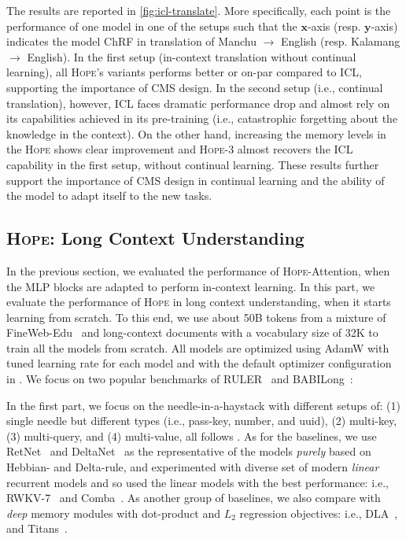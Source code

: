 \documentclass{article}
\newcommand{\citep}{\parencite}
\newcommand{\citet}{\textcite}
\newcommand{\head}[1]{\vspace{1.7mm}\noindent{{\textcolor{c4}{\bf #1.}}}}
\newcommand{\model}[0]{\textsc{Hope}}
\newcommand{\vx}{\boldsymbol{x}}
\newcommand{\vy}{\boldsymbol{y}}
\begin{document}
{The results are reported in \autoref{fig:icl-translate}. More specifically, each point is the performance of one model in one of the setups such that the $\vx$-axis (resp. $\vy$-axis) indicates the model ChRF in translation of Manchu $\rightarrow$ English (resp. Kalamang $\rightarrow$ English). In the first setup (in-context translation without continual learning), all \model's variants performs better or on-par compared to ICL, supporting the importance of CMS design. In the second setup (i.e., continual translation), however, ICL faces dramatic performance drop and almost rely on its capabilities achieved in its pre-training (i.e., catastrophic forgetting about the knowledge in the context). On the other hand, increasing the memory levels in the \model{} shows clear improvement and \model-3 almost recovers the ICL capability in the first setup, without continual learning. These results further support the importance of CMS design in continual learning and the ability of the model to adapt itself to the new tasks. 

\subsection{\model: Long Context Understanding}\label{sec:exp-niah}
In the previous section, we evaluated the performance of \model-Attention, when the MLP blocks are adapted to perform in-context learning. In this part, we evaluate the performance of \model{} in long context understanding, when it starts learning from scratch. To this end, we use about 50B tokens from a mixture of FineWeb-Edu~\citep{penedo2024fineweb} and long-context documents with a vocabulary size of 32K to train all the models from scratch. All models are optimized using AdamW with tuned learning rate for each model and with the default optimizer configuration in \citet{behrouz2024titans}. We focus on two popular benchmarks of RULER~\citep{hsieh2024ruler} and BABILong~\citep{kuratov2024babilong}:

\head{Needle-in-a-Haystack (NIAH) Tasks}
In the first part, we focus on the needle-in-a-haystack with different setups of: (1) single needle but different types (i.e., pass-key, number, and uuid), (2) multi-key, (3) multi-query, and (4) multi-value, all follows \citet{hsieh2024ruler}. As for the baselines, we use RetNet~\citep{sun2023retentive} and DeltaNet~\citep{schlag2021linear} as the representative of the models \emph{purely} based on Hebbian- and Delta-rule, and experimented with diverse set of modern \emph{linear} recurrent models and so used the linear models with the best performance: i.e., RWKV-7~\citep{rwkv-repo} and Comba~\citep{hu2025improving}. As another group of baselines, we also compare with \emph{deep} memory modules with dot-product and $L_2$ regression objectives: i.e., DLA~\citep{behrouz2025atlas}, and Titans~\citep{behrouz2024titans}.

}
\end{document}
